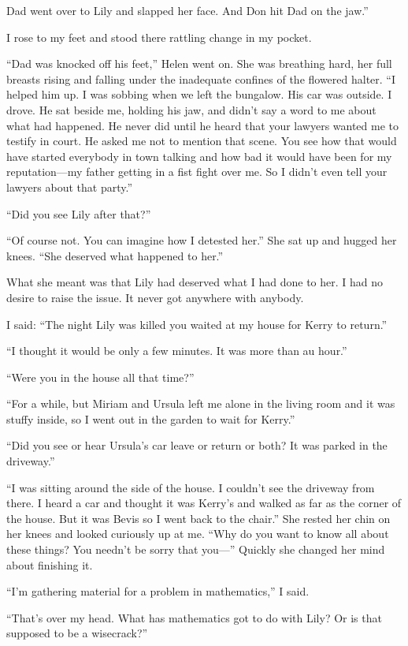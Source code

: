 \documentclass{novel}
\begin{document}
Dad went over to Lily and slapped her face. And Don hit Dad on the jaw.”

I rose to my feet and stood there rattling change in my pocket.

“Dad was knocked off his feet,” Helen went on. She was breathing hard, her full breasts rising and falling under the inadequate confines of the flowered halter. “I helped him up. I was sobbing when we left the bungalow. His car was outside. I drove. He sat beside me, holding his jaw, and didn’t say a word to me about what had happened. He never did until he heard that your lawyers wanted me to testify in court. He asked me not to mention that scene. You see how that would have started everybody in town talking and how bad it would have been for my reputation—my father getting in a fist fight over me. So I didn’t even tell your lawyers about that party.”

“Did you see Lily after that?”

“Of course not. You can imagine how I detested her.” She sat up and hugged her knees. “She deserved what happened to her.”

What she meant was that Lily had deserved what I had done to her. I had no desire to raise the issue. It never got anywhere with anybody.

I said: “The night Lily was killed you waited at my house for Kerry to return.”

“I thought it would be only a few minutes. It was more than au hour.”

“Were you in the house all that time?”

“For a while, but Miriam and Ursula left me alone in the living room and it was stuffy inside, so I went out in the garden to wait for Kerry.”

“Did you see or hear Ursula’s car leave or return or both? It was parked in the driveway.”

“I was sitting around the side of the house. I couldn’t see the driveway from there. I heard a car and thought it was Kerry’s and walked as far as the corner of the house. But it was Bevis so I went back to the chair.” She rested her chin on her knees and looked curiously up at me. “Why do you want to know all about these things? You needn’t be sorry that you—” Quickly she changed her mind about finishing it.

“I’m gathering material for a problem in mathematics,” I said.

“That’s over my head. What has mathematics got to do with Lily? Or is that supposed to be a wisecrack?”
\end{document}
